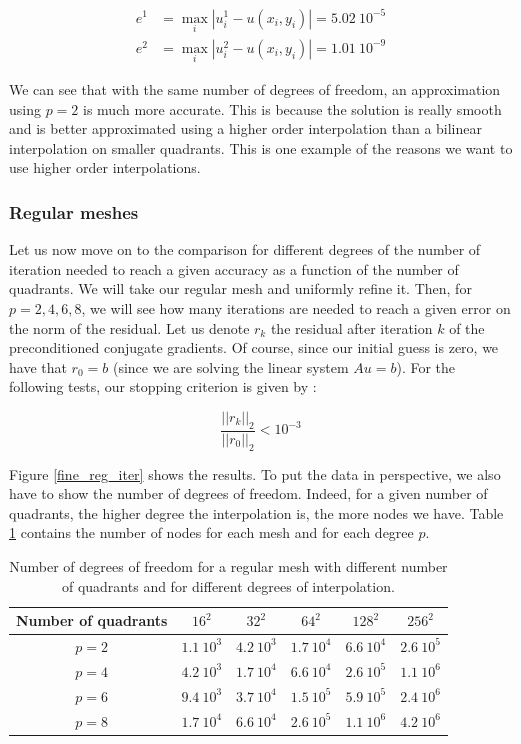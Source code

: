 \begin{align*}
e^1 &= \max_i |u^1_i - u(x_i,y_i)| = 5.02\: 10^{-5}\\
e^2 & = \max_i |u^2_i - u(x_i,y_i)| = 1.01 \: 10^{-9}
\end{align*}

We can see that with the same number of degrees of freedom, an approximation using $p=2$ is much more accurate. This is because the solution is really smooth and is better approximated using a higher order interpolation than a bilinear interpolation on smaller quadrants. This is one example of the reasons we want to use higher order interpolations. 

\subsubsection{Regular meshes}

Let us now move on to the comparison for different degrees of the number of iteration needed to reach a given accuracy as a function of the number of quadrants. We will take our regular mesh and uniformly refine it. Then, for $p=2,4,6,8$, we will see how many iterations are needed to reach a given error on the norm of the residual. Let us denote $r_k$ the residual after iteration $k$ of the preconditioned conjugate gradients. Of course, since our initial guess is zero, we have that $r_0 = b$ (since we are solving the linear system $Au = b$). For the following tests, our stopping criterion is given by :

$$ \frac{||r_k||_2}{||r_0||_2} < 10^{-3}$$

Figure \ref{fine_reg_iter} shows the results. To put the data in perspective, we also have to show the number of degrees of freedom. Indeed, for a given number of quadrants, the higher degree the interpolation is, the more nodes we have. Table \ref{fine_reg_table} contains the number of nodes for each mesh and for each degree $p$.

\begin{table}
\centering
\begin{tabular}{c|ccccc}
\hline
Number of quadrants & $16^2$ & $32^2$ & $64^2$ & $128^2$ & $256^2$\\
\hline
$p=2$ & $1.1\:10^3$ & $4.2\:10^3$ & $1.7\:10^4$ & $6.6\:10^4$ & $2.6\:10^5$\\
$p=4$ & $4.2\:10^3$ & $1.7\:10^4$ & $6.6\:10^4$ & $2.6\:10^5$ & $1.1\:10^6$\\
$p=6$ & $9.4\:10^3$ & $3.7\:10^4$ & $1.5\:10^5$ & $5.9\:10^5$ & $2.4\:10^6$\\
$p=8$ & $1.7\:10^4$ & $6.6\:10^4$ & $2.6\:10^5$ & $1.1\:10^6$ & $4.2\:10^6$\\
\hline
\end{tabular}
\caption{Number of degrees of freedom for a regular mesh with different number of quadrants and for different degrees of interpolation.}
\label{fine_reg_table}
\end{table}

